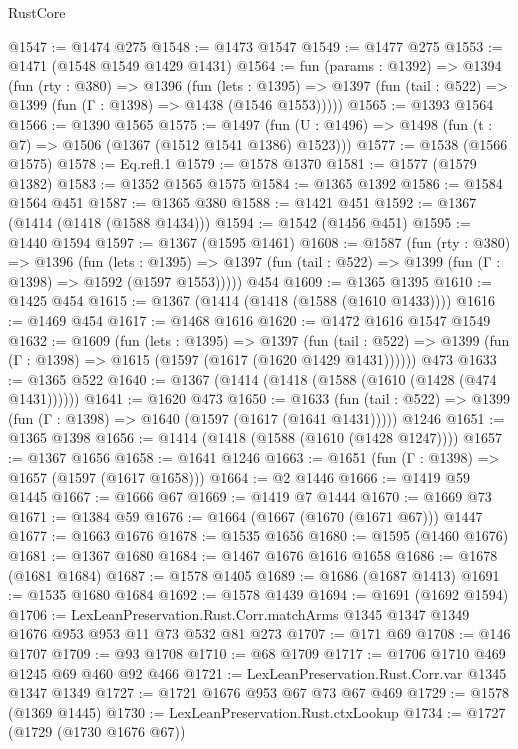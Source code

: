\begin{lexlean}{RustCore}
\begin{coremodule}
@1547 := @1474 @275
@1548 := @1473 @1547
@1549 := @1477 @275
@1553 := @1471 (@1548 @1549 @1429 @1431)
@1564 := fun (params : @1392) =>
  @1394
    (fun (rty : @380) =>
    @1396
      (fun (lets : @1395) =>
      @1397 (fun (tail : @522) => @1399 (fun (Γ : @1398) => @1438 (@1546 @1553)))))
@1565 := @1393 @1564
@1566 := @1390 @1565
@1575 := @1497 (fun (U : @1496) => @1498 (fun (t : @7) => @1506 (@1367 (@1512 @1541 @1386) @1523)))
@1577 := @1538 (@1566 @1575)
@1578 := Eq.refl.{1}
@1579 := @1578 @1370
@1581 := @1577 (@1579 @1382)
@1583 := @1352 @1565 @1575
@1584 := @1365 @1392
@1586 := @1584 @1564 @451
@1587 := @1365 @380
@1588 := @1421 @451
@1592 := @1367 (@1414 (@1418 (@1588 @1434)))
@1594 := @1542 (@1456 @451)
@1595 := @1440 @1594
@1597 := @1367 (@1595 @1461)
@1608 := @1587
    (fun (rty : @380) =>
    @1396
      (fun (lets : @1395) =>
      @1397 (fun (tail : @522) => @1399 (fun (Γ : @1398) => @1592 (@1597 @1553)))))
    @454
@1609 := @1365 @1395
@1610 := @1425 @454
@1615 := @1367 (@1414 (@1418 (@1588 (@1610 @1433))))
@1616 := @1469 @454
@1617 := @1468 @1616
@1620 := @1472 @1616 @1547 @1549
@1632 := @1609
    (fun (lets : @1395) =>
    @1397
      (fun (tail : @522) => @1399 (fun (Γ : @1398) => @1615 (@1597 (@1617 (@1620 @1429 @1431))))))
    @473
@1633 := @1365 @522
@1640 := @1367 (@1414 (@1418 (@1588 (@1610 (@1428 (@474 @1431))))))
@1641 := @1620 @473
@1650 := @1633
    (fun (tail : @522) => @1399 (fun (Γ : @1398) => @1640 (@1597 (@1617 (@1641 @1431)))))
    @1246
@1651 := @1365 @1398
@1656 := @1414 (@1418 (@1588 (@1610 (@1428 @1247))))
@1657 := @1367 @1656
@1658 := @1641 @1246
@1663 := @1651 (fun (Γ : @1398) => @1657 (@1597 (@1617 @1658)))
@1664 := @2 @1446
@1666 := @1419 @59 @1445
@1667 := @1666 @67
@1669 := @1419 @7 @1444
@1670 := @1669 @73
@1671 := @1384 @59
@1676 := @1664 (@1667 (@1670 (@1671 @67))) @1447
@1677 := @1663 @1676
@1678 := @1535 @1656
@1680 := @1595 (@1460 @1676)
@1681 := @1367 @1680
@1684 := @1467 @1676 @1616 @1658
@1686 := @1678 (@1681 @1684)
@1687 := @1578 @1405
@1689 := @1686 (@1687 @1413)
@1691 := @1535 @1680 @1684
@1692 := @1578 @1439
@1694 := @1691 (@1692 @1594)
@1706 := LexLeanPreservation.Rust.Corr.matchArms
    @1345
    @1347
    @1349
    @1676
    @953
    @953
    @11
    @73
    @532
    @81
    @273
@1707 := @171 @69
@1708 := @146 @1707
@1709 := @93 @1708
@1710 := @68 @1709
@1717 := @1706 @1710 @469 @1245 @69 @460 @92 @466
@1721 := LexLeanPreservation.Rust.Corr.var @1345 @1347 @1349
@1727 := @1721 @1676 @953 @67 @73 @67 @469
@1729 := @1578 (@1369 @1445)
@1730 := LexLeanPreservation.Rust.ctxLookup
@1734 := @1727 (@1729 (@1730 @1676 @67))

\end{coremodule}
\end{lexlean}

